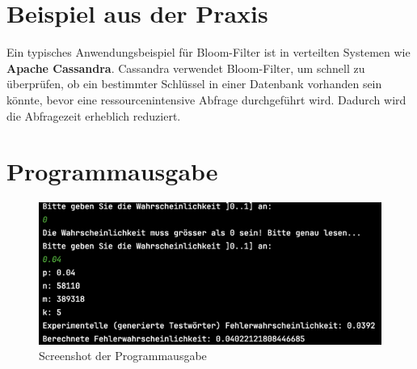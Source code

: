 \documentclass[a4paper, 12pt]{article}
\begin{document}
\section{Beispiel aus der Praxis}\label{sec:beispiel-aus-der-praxis}
Ein typisches Anwendungsbeispiel für Bloom-Filter ist in verteilten Systemen wie \textbf{Apache Cassandra}.
Cassandra verwendet Bloom-Filter, um schnell zu überprüfen, ob ein bestimmter Schlüssel in einer Datenbank vorhanden sein könnte, bevor eine ressourcenintensive Abfrage durchgeführt wird.
Dadurch wird die Abfragezeit erheblich reduziert.

\section{Programmausgabe}\label{sec:programmausgabe}
\begin{figure}[h!]
    \centering
    \includegraphics[width=\textwidth]{example_output}
    \caption{Screenshot der Programmausgabe}
    \label{fig:output}
\end{figure}
\end{document}
